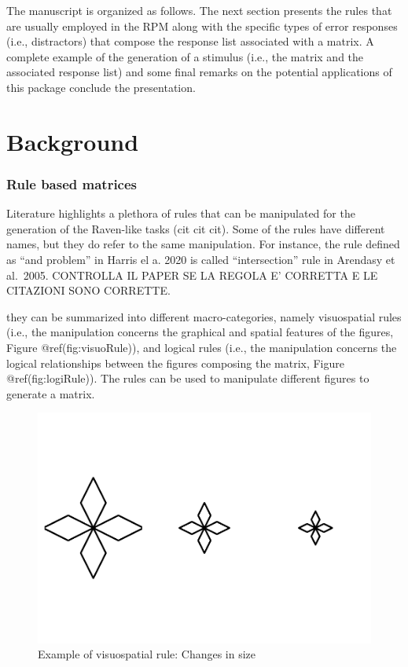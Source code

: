 \documentclass[
]{article}
\begin{document}
The manuscript is organized as follows. The next section presents the
rules that are usually employed in the RPM along with the specific types
of error responses (i.e., distractors) that compose the response list
associated with a matrix. A complete example of the generation of a
stimulus (i.e., the matrix and the associated response list) and some
final remarks on the potential applications of this package conclude the
presentation.

\section{Background}\label{background}

\subsubsection{Rule based matrices}\label{rule-based-matrices}

Literature highlights a plethora of rules that can be manipulated for
the generation of the Raven-like tasks (cit cit cit). Some of the rules
have different names, but they do refer to the same manipulation. For
instance, the rule defined as ``and problem'' in Harris el a. 2020 is
called ``intersection'' rule in Arendasy et al.~2005. CONTROLLA IL PAPER
SE LA REGOLA E' CORRETTA E LE CITAZIONI SONO CORRETTE.

they can be summarized into different macro-categories, namely
visuospatial rules (i.e., the manipulation concerns the graphical and
spatial features of the figures, Figure @ref(fig:visuoRule)), and
logical rules (i.e., the manipulation concerns the logical relationships
between the figures composing the matrix, Figure @ref(fig:logiRule)).
The rules can be used to manipulate different figures to generate a
matrix.

\begin{figure}

{\centering \includegraphics[width=0.7\linewidth]{paper-pdf_files/figure-latex/visuoRule-1} 

}

\caption{Example of visuospatial rule: Changes in size}\label{fig:visuoRule}
\end{figure}
\end{document}
